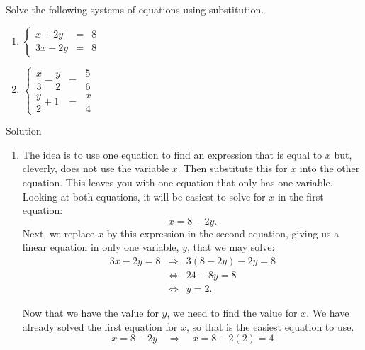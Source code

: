 \begin{example}\label{syst_lin_eq_substitution_ex1}
Solve the following systems of equations using substitution.
\begin{multicols}{2}
\begin{enumerate}
\item $\left\{ \begin{array}{rcl} x+2y &=& 8 \\[0.1cm] 3x - 2y &=& 8  \end{array} \right. $
\item $\left\{ \begin{array}{rcl} \dfrac{x}{3}-\dfrac{y}{2} &=& \dfrac{5}{6} \\[0.4cm] \dfrac{y}{2} + 1  &=& \dfrac{x}{4}  \end{array} \right. $
\end{enumerate}
\end{multicols}

Solution 

\begin{enumerate}
\item The idea is to use one equation to find an expression that is equal to $x$ but, cleverly, does not use the variable $x$. Then substitute this for $x$ into the other equation. This leaves you with one equation that only has one variable. Looking at both equations, it will be easiest to solve for $x$ in the first equation:
\[x=8-2y. \]
Next, we replace $x$ by this expression in the second equation, giving us a linear equation in only one variable, $y$, that we may solve:
\begin{eqnarray*}
3x - 2y = 8 &\Rightarrow & 3(8-2y)-2y=8 \\ 
&\Leftrightarrow & 24-8y=8 \\ 
&\Leftrightarrow & y=2. 
\end{eqnarray*}

Now that we have the value for $y$, we need to find the value for $x$. We have already solved the first equation for $x$, so that is the easiest equation to use.
\[	x=8-2y \quad \Rightarrow \quad x = 8-2(2) = 4 \]


\end{enumerate}
\end{example}
